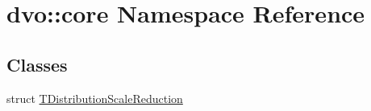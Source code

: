\hypertarget{namespacedvo_1_1core}{}\section{dvo\+:\+:core Namespace Reference}
\label{namespacedvo_1_1core}
\subsection*{Classes}
\begin{DoxyCompactItemize}
\item 
struct \mbox{\hyperlink{structdvo_1_1core_1_1_t_distribution_scale_reduction}{T\+Distribution\+Scale\+Reduction}}
\end{DoxyCompactItemize}
